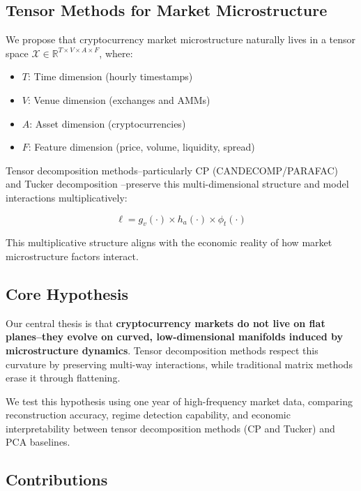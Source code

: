 \documentclass{article}
\begin{document}
\subsection{Tensor Methods for Market Microstructure}

We propose that cryptocurrency market microstructure naturally lives in a tensor space $\mathcal{X} \in \mathbb{R}^{T \times V \times A \times F}$, where:

\begin{itemize}[leftmargin=*]
    \item $T$: Time dimension (hourly timestamps)
    \item $V$: Venue dimension (exchanges and AMMs)
    \item $A$: Asset dimension (cryptocurrencies)
    \item $F$: Feature dimension (price, volume, liquidity, spread)
\end{itemize}

Tensor decomposition methods--particularly CP (CANDECOMP/PARAFAC) \citep{Kolda2009Tensor} and Tucker decomposition \citep{Tucker1966Some,DeLathauwer2000Multilinear}--preserve this multi-dimensional structure and model interactions multiplicatively:

$$\ell = g_{v}(\cdot) \times h_{a}(\cdot) \times \phi_{t}(\cdot)$$

This multiplicative structure aligns with the economic reality of how market microstructure factors interact.

\subsection{Core Hypothesis}

Our central thesis is that \textbf{cryptocurrency markets do not live on flat planes--they evolve on curved, low-dimensional manifolds induced by microstructure dynamics}. Tensor decomposition methods respect this curvature by preserving multi-way interactions, while traditional matrix methods erase it through flattening.

We test this hypothesis using one year of high-frequency market data, comparing reconstruction accuracy, regime detection capability, and economic interpretability between tensor decomposition methods (CP and Tucker) and PCA baselines.

\subsection{Contributions}
\end{document}
